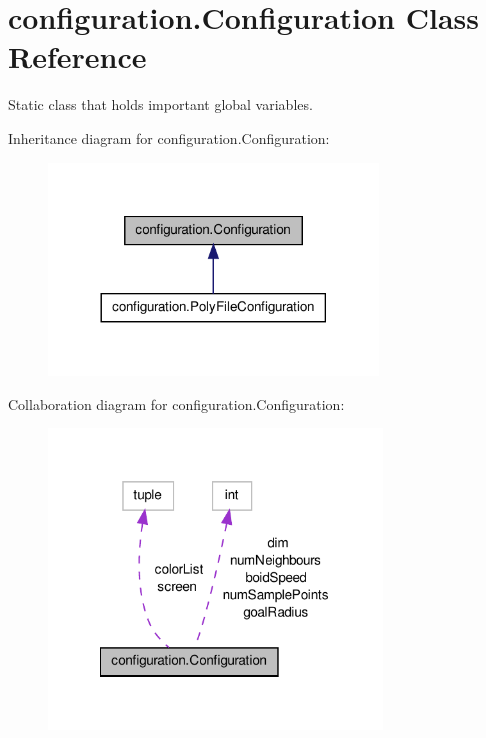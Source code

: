 \hypertarget{classconfiguration_1_1Configuration}{\section{configuration.\-Configuration Class Reference}
\label{classconfiguration_1_1Configuration}
}


Static class that holds important global variables.  




Inheritance diagram for configuration.\-Configuration\-:\nopagebreak
\begin{figure}[H]
\begin{center}
\leavevmode
\includegraphics[width=248pt]{classconfiguration_1_1Configuration__inherit__graph}
\end{center}
\end{figure}


Collaboration diagram for configuration.\-Configuration\-:\nopagebreak
\begin{figure}[H]
\begin{center}
\leavevmode
\includegraphics[width=251pt]{classconfiguration_1_1Configuration__coll__graph}
\end{center}
\end{figure}
